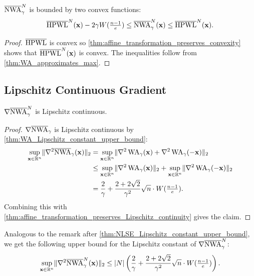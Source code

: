 \begin{corollary}
 \(\overline{\operatorname{NWA}}_\gamma^N\) is bounded by two convex functions:
 \[ \overline{\operatorname{HPWL}}^N(\mathbf{x}) - 2 \gamma W(\tfrac{n-1}{e}) \leq \overline{\operatorname{NWA}}_\gamma^N(\mathbf{x}) \leq \overline{\operatorname{HPWL}}^N(\mathbf{x}). \]
\end{corollary}

\begin{proof}
 \(\overline{\operatorname{HPWL}}\) is convex so \cref{thm:affine_transformation_preserves_convexity} shows that \(\overline{\operatorname{HPWL}}^N(\mathbf{x})\) is convex.
 The inequalities follow from \cref{thm:WA_approximates_max}.
\end{proof}



\subsection{Lipschitz Continuous Gradient} \label{sec:NWA_Lipschitz_continuous_gradient}

\begin{corollary} \label{thm:NWA_Lipschitz_constant_upper_bound}
 \(\nabla \overline{\operatorname{NWA}}_\gamma^N\) is Lipschitz continuous.
\end{corollary}

\begin{proof}
 \(\nabla \overline{\operatorname{NWA}}_\gamma\) is Lipschitz continuous by \cref{thm:WA_Lipschitz_constant_upper_bound}:
 \begin{align*}
   \sup_{\mathbf{x} \in \mathbb{R}^n} \lVert\nabla^2 \overline{\operatorname{NWA}}_\gamma(\mathbf{x})\rVert_2 
   &= \sup_{\mathbf{x} \in \mathbb{R}^n} \lVert\nabla^2 \operatorname{WA}_\gamma(\mathbf{x}) + \nabla^2 \operatorname{WA}_\gamma(-\mathbf{x})\rVert_2 \\
   &\leq \sup_{\mathbf{x} \in \mathbb{R}^n} \lVert\nabla^2 \operatorname{WA}_\gamma(\mathbf{x})\rVert_2 + \sup_{\mathbf{x} \in \mathbb{R}^n} \lVert\nabla^2 \operatorname{WA}_\gamma(-\mathbf{x})\rVert_2 \\
   &= \frac{2}{\gamma} + \frac{2+2\sqrt{2}}{\gamma^2} \sqrt{n} \cdot W(\tfrac{n-1}{e}) .
 \end{align*}
 Combining this with \cref{thm:affine_transformation_preserves_Lipschitz_continuity} gives the claim.
\end{proof}

\begin{remark}
 Analogous to the remark after \cref{thm:NLSE_Lipschitz_constant_upper_bound},
 we get the following upper bound for the Lipschitz constant of \(\nabla \overline{\operatorname{NWA}}_\gamma^N\):
 \[ \sup_{\mathbf{x} \in \mathbb{R}^n} \lVert\nabla^2 \overline{\operatorname{NWA}}_\gamma^N(\mathbf{x})\rVert_2 \leq \lvert N\rvert \left({ \frac{2}{\gamma} + \frac{2+2\sqrt{2}}{\gamma^2} \sqrt{n} \cdot W(\tfrac{n-1}{e}) }\right). \]
\end{remark}

